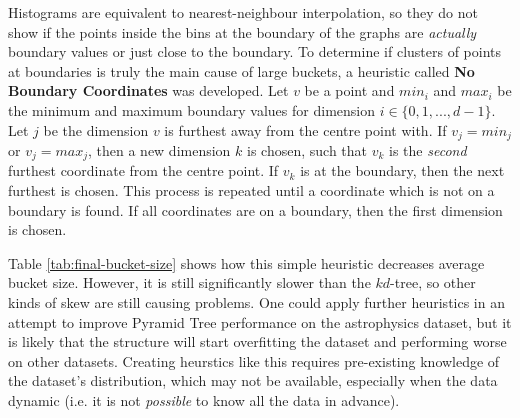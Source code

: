 \begin{table}
	\centering
	\caption{Pyramid Tree Bucket Size Statistics with Different Dimensions of Astrophysics Dataset}
	\label{tab:final-bucket-size}
\end{table}

Histograms are equivalent to nearest-neighbour interpolation, so they do not show if the points inside the bins at the boundary of the graphs are \textit{actually} boundary values or just close to the boundary. To determine if clusters of points at boundaries is truly the main cause of large buckets, a heuristic called \textbf{No Boundary Coordinates} was developed. Let $v$ be a point and $min_i$ and $max_i$ be the minimum and maximum boundary values for dimension $i \in \lbrace 0, 1, ..., d - 1 \rbrace$. Let $j$ be the dimension $v$ is furthest away from the centre point with. If $v_j = min_j$ or $v_j = max_j$, then a new dimension $k$ is chosen, such that $v_k$ is the \textit{second} furthest coordinate from the centre point. If $v_k$ is at the boundary, then the next furthest is chosen. This process is repeated until a coordinate which is not on a boundary is found. If all coordinates are on a boundary, then the first dimension is chosen.

Table \ref{tab:final-bucket-size} shows how this simple heuristic decreases average bucket size. However, it is still significantly slower than the $kd$-tree, so other kinds of skew are still causing problems. One could apply further heuristics in an attempt to improve Pyramid Tree performance on the astrophysics dataset, but it is likely that the structure will start overfitting the dataset and performing worse on other datasets. Creating heurstics like this requires pre-existing knowledge of the dataset's distribution, which may not be available, especially when the data dynamic (i.e. it is not \textit{possible} to know all the data in advance).

